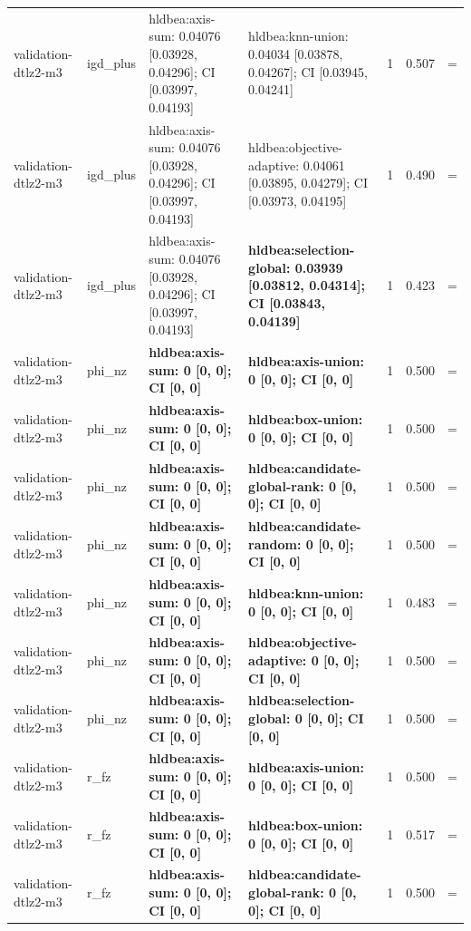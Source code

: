\begin{tabular}{llllrrc}
validation-dtlz2-m3 & igd\_plus & hldbea:axis-sum: 0.04076 [0.03928, 0.04296]; CI [0.03997, 0.04193] & hldbea:knn-union: 0.04034 [0.03878, 0.04267]; CI [0.03945, 0.04241] & 1 & 0.507 & = \\
validation-dtlz2-m3 & igd\_plus & hldbea:axis-sum: 0.04076 [0.03928, 0.04296]; CI [0.03997, 0.04193] & hldbea:objective-adaptive: 0.04061 [0.03895, 0.04279]; CI [0.03973, 0.04195] & 1 & 0.490 & = \\
validation-dtlz2-m3 & igd\_plus & hldbea:axis-sum: 0.04076 [0.03928, 0.04296]; CI [0.03997, 0.04193] & \textbf{hldbea:selection-global: 0.03939 [0.03812, 0.04314]; CI [0.03843, 0.04139]} & 1 & 0.423 & = \\
validation-dtlz2-m3 & phi\_nz & \textbf{hldbea:axis-sum: 0 [0, 0]; CI [0, 0]} & \textbf{hldbea:axis-union: 0 [0, 0]; CI [0, 0]} & 1 & 0.500 & = \\
validation-dtlz2-m3 & phi\_nz & \textbf{hldbea:axis-sum: 0 [0, 0]; CI [0, 0]} & \textbf{hldbea:box-union: 0 [0, 0]; CI [0, 0]} & 1 & 0.500 & = \\
validation-dtlz2-m3 & phi\_nz & \textbf{hldbea:axis-sum: 0 [0, 0]; CI [0, 0]} & \textbf{hldbea:candidate-global-rank: 0 [0, 0]; CI [0, 0]} & 1 & 0.500 & = \\
validation-dtlz2-m3 & phi\_nz & \textbf{hldbea:axis-sum: 0 [0, 0]; CI [0, 0]} & \textbf{hldbea:candidate-random: 0 [0, 0]; CI [0, 0]} & 1 & 0.500 & = \\
validation-dtlz2-m3 & phi\_nz & \textbf{hldbea:axis-sum: 0 [0, 0]; CI [0, 0]} & \textbf{hldbea:knn-union: 0 [0, 0]; CI [0, 0]} & 1 & 0.483 & = \\
validation-dtlz2-m3 & phi\_nz & \textbf{hldbea:axis-sum: 0 [0, 0]; CI [0, 0]} & \textbf{hldbea:objective-adaptive: 0 [0, 0]; CI [0, 0]} & 1 & 0.500 & = \\
validation-dtlz2-m3 & phi\_nz & \textbf{hldbea:axis-sum: 0 [0, 0]; CI [0, 0]} & \textbf{hldbea:selection-global: 0 [0, 0]; CI [0, 0]} & 1 & 0.500 & = \\
validation-dtlz2-m3 & r\_fz & \textbf{hldbea:axis-sum: 0 [0, 0]; CI [0, 0]} & \textbf{hldbea:axis-union: 0 [0, 0]; CI [0, 0]} & 1 & 0.500 & = \\
validation-dtlz2-m3 & r\_fz & \textbf{hldbea:axis-sum: 0 [0, 0]; CI [0, 0]} & \textbf{hldbea:box-union: 0 [0, 0]; CI [0, 0]} & 1 & 0.517 & = \\
validation-dtlz2-m3 & r\_fz & \textbf{hldbea:axis-sum: 0 [0, 0]; CI [0, 0]} & \textbf{hldbea:candidate-global-rank: 0 [0, 0]; CI [0, 0]} & 1 & 0.500 & = \\

\end{tabular}
